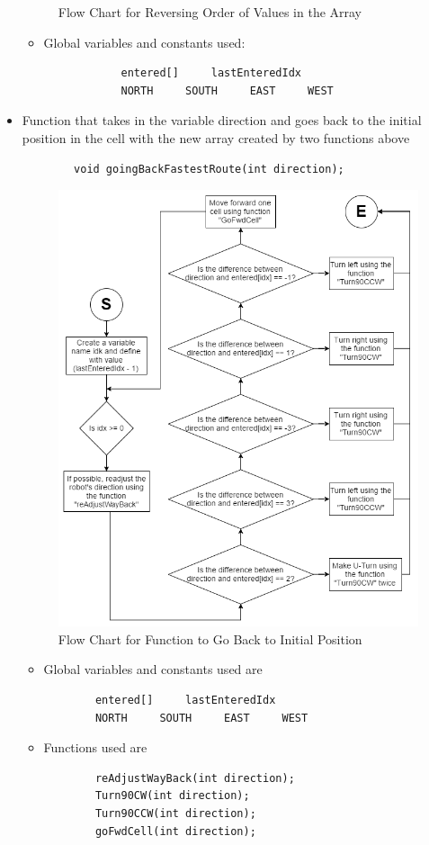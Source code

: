 \documentclass[11pt]{article}
\begin{document}
\begin{itemize}
\begin{figure}[htp]
\caption{Flow Chart for Reversing Order of Values in the Array}
\label{}
\end{figure}
	\begin{itemize}
	\item Global variables and constants used:
 		\begin{verbatim}
			entered[]     lastEnteredIdx
			NORTH     SOUTH     EAST     WEST
		\end{verbatim}
	\end{itemize}
\item Function that takes in the variable direction and goes back to the initial position in the cell with the new array created by two functions above
 	\begin{verbatim}
		void goingBackFastestRoute(int direction);
	\end{verbatim}
\begin{figure}[htp]
\centering
\includegraphics[scale=0.53]{images/Software_Flowchart/goingBackFastestRoute.png}
\caption{Flow Chart for Function to Go Back to Initial Position}
\label{}
\end{figure}
	\begin{itemize}
	\item Global variables and constants used are
	\begin{verbatim}
		entered[]     lastEnteredIdx
		NORTH     SOUTH     EAST     WEST
	\end{verbatim}
	\item Functions used are
	\begin{verbatim}
		reAdjustWayBack(int direction);	
		Turn90CW(int direction);
		Turn90CCW(int direction);
		goFwdCell(int direction);
	\end{verbatim}
	\end{itemize}
\end{itemize}
\end{document}

